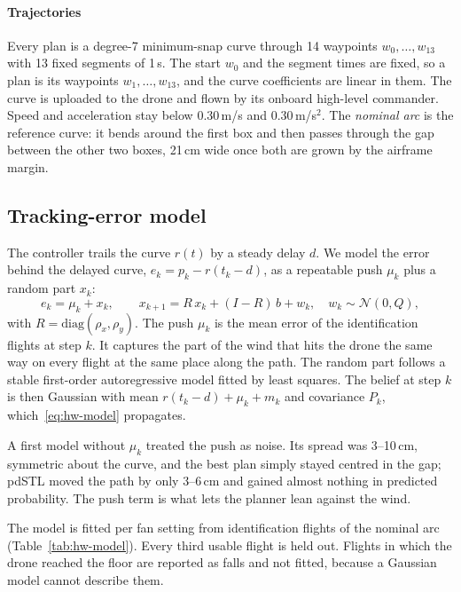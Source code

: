 \paragraph{Trajectories}
Every plan is a degree-7 minimum-snap curve through 14 waypoints
$w_0, \dots, w_{13}$ with 13 fixed segments of 1\,s. The start $w_0$ and
the segment times are fixed, so a plan is its waypoints
$w_1, \dots, w_{13}$, and the curve coefficients are linear in them. The
curve is uploaded to the drone and flown by its onboard high-level
commander. Speed and acceleration stay below 0.30\,m/s and
0.30\,m/s$^2$. The \emph{nominal arc} is the reference curve: it bends
around the first box and then passes through the gap between the other
two boxes, 21\,cm wide once both are grown by the airframe margin.

\subsection{Tracking-error model}
\label{sec:hw-model}

The controller trails the curve $r(t)$ by a steady delay $d$. We model the
error behind the delayed curve, $e_k = p_k - r(t_k - d)$, as a repeatable
push $\mu_k$ plus a random part $x_k$:
\begin{equation}
  e_k = \mu_k + x_k, \qquad
  x_{k+1} = R\,x_k + (I - R)\,b + w_k, \quad w_k \sim \mathcal{N}(0, Q),
  \label{eq:hw-model}
\end{equation}
with $R = \mathrm{diag}(\rho_x, \rho_y)$. The push $\mu_k$ is the mean
error of the identification flights at step $k$. It captures the part of
the wind that hits the drone the same way on every flight at the same
place along the path. The random part follows a stable first-order
autoregressive model fitted by least squares. The belief at step $k$ is
then Gaussian with mean $r(t_k - d) + \mu_k + m_k$ and covariance $P_k$,
which~\eqref{eq:hw-model} propagates.

A first model without $\mu_k$ treated the push as noise. Its spread was
3--10\,cm, symmetric about the curve, and the best plan simply stayed
centred in the gap; pdSTL moved the path by only 3--6\,cm and gained
almost nothing in predicted probability. The
push term is what lets the planner lean against the wind.

The model is fitted per fan setting from identification flights of the
nominal arc (Table~\ref{tab:hw-model}). Every third usable flight is held
out. Flights in which the drone reached the floor are reported as falls
and not fitted, because a Gaussian model cannot describe them.

